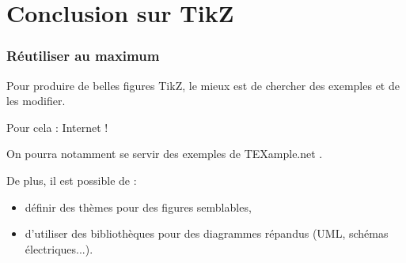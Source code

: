 \section{Conclusion sur TikZ}

\begin{frame}
  \frametitle{Réutiliser au maximum}

Pour produire de belles figures TikZ, le mieux est de chercher des exemples et de les modifier.

\begin{center}
Pour cela : \Huge Internet !
\end{center}

On pourra notamment se servir des exemples de TEXample.net \cite{tikzandpgfexamples}.

\bigskip
De plus, il est possible de :
\begin{itemize}
  \item définir des thèmes pour des figures semblables,
  \item d'utiliser des bibliothèques pour des diagrammes répandus (UML, schémas électriques...).
\end{itemize}
\end{frame}
